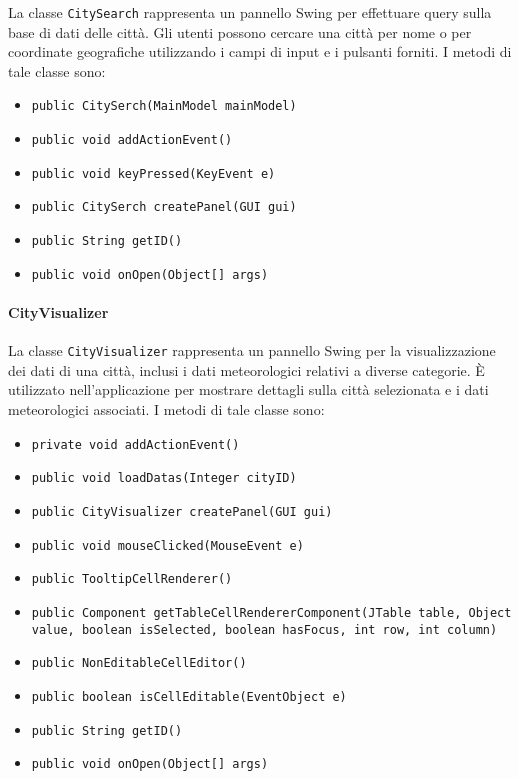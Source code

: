 La classe \texttt{CitySearch} rappresenta un pannello Swing per effettuare query sulla base di dati delle città.
Gli utenti possono cercare una città per nome o per coordinate geografiche utilizzando i campi di input e i pulsanti forniti.
I metodi di tale classe sono:
\begin{itemize}
    \item \texttt{public CitySerch(MainModel mainModel)}
    \item \texttt{public void addActionEvent()}
    \item \texttt{public void keyPressed(KeyEvent e)}
    \item \texttt{public CitySerch createPanel(GUI gui)}
    \item \texttt{public String getID()}
    \item \texttt{public void onOpen(Object[] args)}
\end{itemize}

\paragraph{CityVisualizer}

La classe \texttt{CityVisualizer} rappresenta un pannello Swing per la visualizzazione dei dati di una città, inclusi i dati meteorologici relativi a diverse categorie.
È utilizzato nell'applicazione per mostrare dettagli sulla città selezionata e i dati meteorologici associati.
I metodi di tale classe sono:
\begin{itemize}
    \item \texttt{private void addActionEvent()}
    \item \texttt{public void loadDatas(Integer cityID)}
    \item \texttt{public CityVisualizer createPanel(GUI gui)}
    \item \texttt{public void mouseClicked(MouseEvent e)}
    \item \texttt{public TooltipCellRenderer()}
    \item \texttt{public Component getTableCellRendererComponent(JTable table, Object value, boolean isSelected, boolean hasFocus, int row, int column)}
    \item  \texttt{public NonEditableCellEditor()}
    \item \texttt{public boolean isCellEditable(EventObject e)}
    \item \texttt{public String getID()}
    \item \texttt{public void onOpen(Object[] args)}
\end{itemize}

